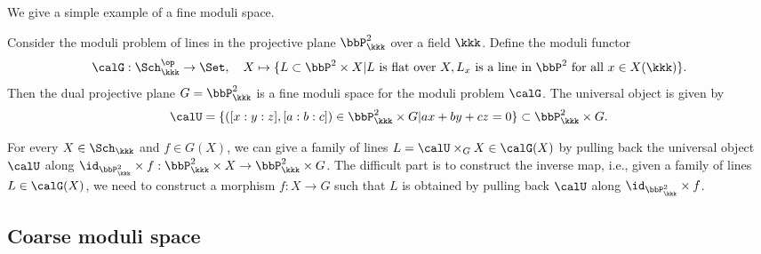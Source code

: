     We give a simple example of a fine moduli space.

    \begin{example}\label{eg:moduli_of_lines_in_P2}
        Consider the moduli problem of lines in the projective plane \(\bbP_{\kkk}^2\) over a field \(\kkk\).
        Define the moduli functor
        \[
            \calG: \Sch_{\kkk}^{\op} \to \Set,\quad X \mapsto \{L \subset \bbP^2 \times X | L \text{ is flat over } X, L_x \text{ is a line in } \bbP^2 \text{ for all } x \in X(\kkk)\}.
        \]
        Then the dual projective plane \(G = \bbP_{\kkk}^2\) is a fine moduli space for the moduli problem \(\calG\).
        The universal object is given by 
        \[
            \calU = \{([x:y:z], [a:b:c]) \in \bbP_{\kkk}^2 \times G | ax + by + cz = 0\} \subset \bbP_{\kkk}^2 \times G.
        \]

        For every \(X \in \Sch_{\kkk}\) and \(f \in G(X)\), we can give a family of lines \(L = \calU \times_G X \in \calG(X)\) by pulling back the universal object \(\calU\) along \(\id_{\bbP_{\kkk}^2} \times f: \bbP_{\kkk}^2 \times X \to \bbP_{\kkk}^2 \times G\).
        The difficult part is to construct the inverse map, i.e., given a family of lines \(L \in \calG(X)\), we need to construct a morphism \(f: X \to G\) such that \(L\) is obtained by pulling back \(\calU\) along \(\id_{\bbP_{\kkk}^2} \times f\).

    \end{example}

    


\subsection{Coarse moduli space}